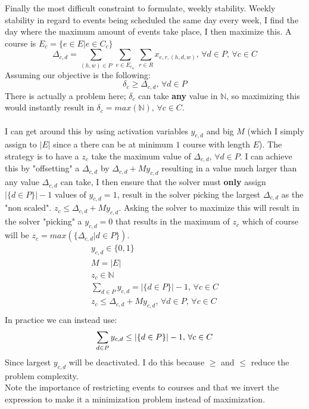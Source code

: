 \documentclass{article}
\begin{document}
    \subsubsection{}
    Finally the most difficult constraint to formulate, weekly stability.
    Weekly stability in regard to events being scheduled the same day every week, I find the day where the maximum amount of events take place, I then maximize this.
    A course is $E_c = \{e \in E | e \in C_c \}$
    \[\Delta_{c,d} =  \sum_{(h,w) \in P} \, \sum_{e \in E_{c_w}} \,\sum_{r \in R}  x_{e,r,(h,d,w)}, \, \forall d \in P, \, \forall c \in C\]
    Assuming our objective is the following:
    \[\delta_c \geq \Delta_{c,d} , \, \forall d \in P\]
    There is actually a problem here; $\delta_c$ can take \textbf{any} value in $\mathbb{N}$, so maximizing this would instantly result in $\delta_c = max(\mathbb{N}) , \, \forall c \in C$.
    \\\\
    I can get around this by using activation variables $y_{c,d}$ and big $M$ (which I simply assign to $|E|$ since a there can be at minimum $1$ course with length $E$).
    The strategy is to have a $z_c$ take the maximum value of $\Delta_{c,d}, \, \forall d \in P$.
    I can achieve this by "offsetting" a $\Delta_{c,d}$ by $\Delta_{c,d} + M y_{c,d}$ resulting in a value much larger than any value $\Delta_{c,d}$ can take, I then ensure that the solver must \textbf{only} assign $|\{d \in P\}| - 1$ values of $y_{c,d} = 1$, result in the solver picking the largest $\Delta_{c,d}$ as the "non scaled".
    $z_c \leq \Delta_{c,d} + M y_{c,d}$.
    Asking the solver to maximize this will result in the solver "picking" a $y_{c,d} = 0$ that results in the maximum of $z_c$ which of course will be $z_c = max(\{\Delta_{c,d} | d \in P\})$.
    \begin{gather*}
        y_{c,d} \in \{0, 1\}\\
        M = |E|\\
        z_c \in \mathbb{N}\\
        \sum_{d \in P} y_{c,d} = |\{d \in P\}| - 1 , \, \forall c \in C\\
        z_c \leq \Delta_{c,d} + M y_{c,d} , \, \forall d \in P , \, \forall c \in C\\
    \end{gather*}
    In practice we can instead use:
    \[
        \sum_{d \in P} y_{c,d} \leq |\{d \in P\}| - 1 , \, \forall c \in C\\
    \]
    Since largest $y_{c,d}$ will be deactivated.
    I do this because $\geq$ and $\leq$ reduce the problem complexity.\\
    Note the importance of restricting events to courses and that we invert the expression to make it a minimization problem instead of maximization.
\end{document}
